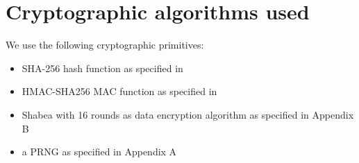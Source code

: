 \section{Cryptographic algorithms used}
We use the following cryptographic primitives:
\begin{itemize}
 \item SHA-256 hash function as specified in \cite{FIPS180-2}
 \item HMAC-SHA256 MAC function as specified in \cite{RFC2104}
 \item Shabea with 16 rounds as data encryption algorithm as specified in Appendix B
 \item a PRNG as specified in Appendix A
\end{itemize}